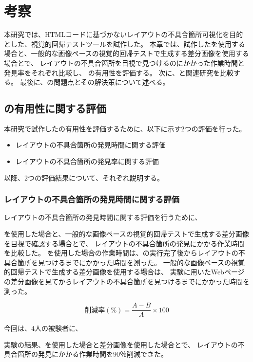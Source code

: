 \chapter{考察}\label{cha:Discussion}
本研究では、HTMLコードに基づかないレイアウトの不具合箇所可視化を目的とした、視覚的回帰テストツール\toolName を試作した。
本章では、試作した\toolName を使用する場合と、一般的な画像ペースの視覚的回帰テストで生成する差分画像を使用する場合とで、
レイアウトの不具合箇所を目視で見つけるのにかかった作業時間と発見率をそれぞれ比較し、
\toolName の有用性を評価する。
次に、\toolName と関連研究を比較する。
最後に、\toolName の問題点とその解決策について述べる。



\section{\toolName の有用性に関する評価}\label{sec:evalue_usefulness}
本研究で試作した\toolName の有用性を評価するために、以下に示す2つの評価を行った。
\begin{itemize}
    \item レイアウトの不具合箇所の発見時間に関する評価
    \item レイアウトの不具合箇所の発見率に関する評価
\end{itemize}
以降、2つの評価結果について、それぞれ説明する。


\subsection{レイアウトの不具合箇所の発見時間に関する評価}\label{subsec:evalue_required_time}
レイアウトの不具合箇所の発見時間に関する評価を行うために、

\toolName を使用した場合と、一般的な画像ペースの視覚的回帰テストで生成する差分画像を目視で確認する場合とで、
レイアウトの不具合箇所の発見にかかる作業時間を比較した。
\toolName を使用した場合の作業時間は、\toolName の実行完了後からレイアウトの不具合箇所を見つけるまでにかかった時間を測った。
一般的な画像ペースの視覚的回帰テストで生成する差分画像を使用する場合は、
実験に用いたWebページの差分画像を見てからレイアウトの不具合箇所を見つけるまでにかかった時間を測った。

\begin{equation}\label{equ:reduction_rate}
    削減率(\%) = \frac{A - B}{A} \times 100
\end{equation}

今回は、4人の被験者に、

実験の結果、\toolName を使用した場合と差分画像を使用した場合とで、
レイアウトの不具合箇所の発見にかかる作業時間を90％削減できた。

